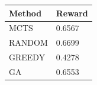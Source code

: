 \begin{tabular}{ll}
\hline
Method & Reward \\
\hline
  MCTS & 0.6567 \\
  RANDOM & 0.6699 \\
  GREEDY & 0.4278 \\
  GA & 0.6553 \\
\hline
\end{tabular}
